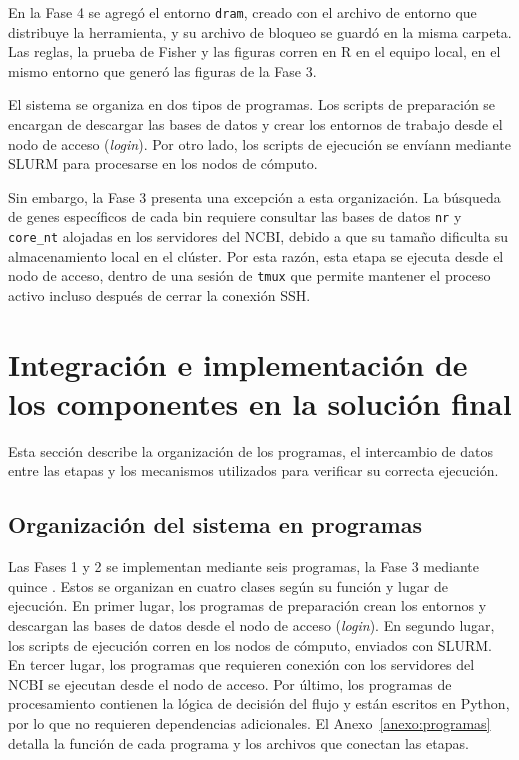 \begin{nuevo}
En la Fase 4 se agregó el entorno \texttt{dram}, creado con el archivo de
entorno que distribuye la herramienta, y su archivo de bloqueo se guardó en la
misma carpeta. Las reglas, la prueba de Fisher y las figuras corren en R en el
equipo local, en el mismo entorno que generó las figuras de la Fase 3.
\end{nuevo}

El sistema se organiza en dos tipos de programas. Los scripts de preparación
se encargan de descargar las bases de datos y crear los entornos de trabajo desde
el nodo de acceso (\textit{login}). Por otro lado, los scripts de ejecución se
envíann mediante SLURM para procesarse en los nodos de cómputo.

Sin embargo, la Fase 3 presenta una excepción a esta organización. La búsqueda
de genes específicos de cada bin requiere consultar las bases de datos \texttt{nr}
y \texttt{core\_nt} alojadas en los servidores del NCBI, debido a que su tamaño
dificulta su almacenamiento local en el clúster. Por esta razón, esta etapa se
ejecuta desde el nodo de acceso, dentro de una sesión de \texttt{tmux} que permite
mantener el proceso activo incluso después de cerrar la conexión SSH.

\section{Integración e implementación de los componentes en la solución final}

Esta sección describe la organización de los programas, el intercambio de datos entre
 las etapas y los mecanismos utilizados para verificar su correcta ejecución.

\subsection{Organización del sistema en programas}

Las Fases 1 y 2 se implementan mediante seis programas, la Fase 3 mediante quince
.
Estos se organizan en cuatro clases según su función y lugar de ejecución.
En primer lugar, los programas de preparación crean los entornos y descargan las
bases de datos desde el nodo de acceso (\textit{login}). En segundo lugar, los scripts
de ejecución corren en los nodos de cómputo, enviados con SLURM. En tercer lugar, los programas que
requieren conexión con los servidores del NCBI se ejecutan desde el nodo de
acceso. Por último, los programas de procesamiento contienen la lógica de decisión
del flujo y están escritos en Python,
por lo que no requieren dependencias adicionales.  El Anexo~\ref{anexo:programas}
detalla la función de cada programa y los archivos que conectan las etapas.

